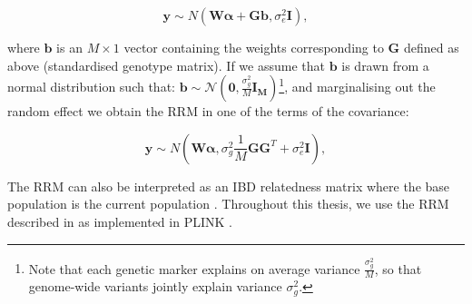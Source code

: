 \begin{equation}\label{eq:polygenic_model}
    \mathbf{y} \sim N (\mathbf{W}\boldsymbol{\alpha} +  \mathbf{G}\mathbf{b}, \sigma_e^2\mathbf{I}),
\end{equation}

where $\mathbf{b}$ is an $M \times 1$ vector containing the weights corresponding to $\mathbf{G}$ defined as above (standardised genotype matrix).
If we assume that $\mathbf{b}$ is drawn from a normal distribution such that: $\mathbf{b} \sim \mathcal{N}(\mathbf{0}, \frac{\sigma_g^2}{M} \mathbf{I_M})$\footnote{Note that each genetic marker explains on average variance $\frac{\sigma_g^2}{M}$, so that genome-wide variants jointly explain variance $\sigma_g^2$.}, and marginalising out the random effect we obtain the RRM in one of the terms of the covariance:

\begin{equation}\label{eq:polygenic_model_MVN}
    \mathbf{y} \sim N (\mathbf{W}\boldsymbol{\alpha}, \sigma_g^2\frac{1}{M}\mathbf{G}\mathbf{G}^T + \sigma_e^2\mathbf{I} ),
\end{equation}

The $\mathrm{RRM}$ can also be interpreted as an IBD relatedness matrix where the base population
is the current population \cite{powell2010reconciling}. 
Throughout this thesis, we use the $\mathrm{RRM}$ described in \cite{yang2011gcta} as implemented in PLINK \cite{purcell2007plink}.






